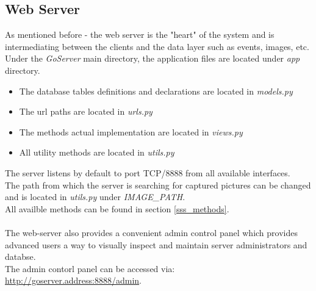 \documentclass[10pt]{article}
\begin{document}
\subsection{Web Server}
As mentioned before - the web server is the "heart" of the system and is intermediating between the clients and the data layer such as events, images, etc. \\ 
Under the \emph{GoServer} main directory, the application files are located under \emph{app} directory. \\
\begin{itemize}	
	\item The database tables definitions and declarations are located in \emph{models.py}
	\item The url paths are located in \emph{urls.py}
	\item The methods actual implementation are located in \emph{views.py}
	\item All utility methods are located in \emph{utils.py}
\end{itemize}
The server listens by default to port TCP/8888 from all available interfaces. \\
The path from which the server is searching for captured pictures can be changed and is located in \emph{utils.py} under \emph{IMAGE\_PATH}. \\
All availble methods can be found in section \ref{sss_methods}. \\
\\ The web-server also provides a convenient admin control panel which provides advanced users a way to visually inspect and maintain server administrators and databse. \\
The admin contorl panel can be accessed via: \underline{http://goserver.address:8888/admin}. \\
\end{document}
